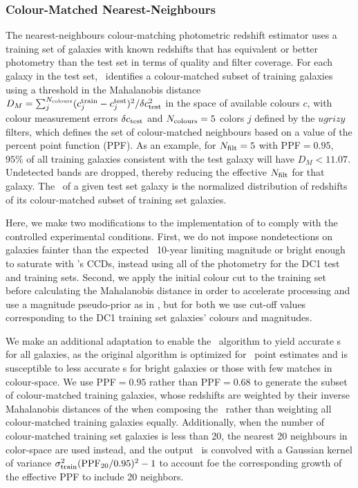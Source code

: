 \subsubsection{Colour-Matched Nearest-Neighbours}
\label{sec:cmnn}

The nearest-neighbours colour-matching photometric redshift estimator \citep[\cmnn,][]{Graham:17} uses a training set of galaxies with known redshifts that has equivalent or better photometry than the test set in terms of quality and filter coverage.
For each galaxy in the test set, \cmnn\ identifies a colour-matched subset of training galaxies using a threshold in the Mahalanobis distance $D_M = \sum_{j}^{N_{\rm colours}} (c^{\rm train}_{j} - c^{\rm test}_{j})^{2} / \delta c_{\rm test}^2$ in the space of available colours $c$, with colour measurement errors $\delta c_{\rm test}$ and $N_{\rm colours} = 5$ colors $j$ defined by the $ugrizy$ filters, which defines the set of colour-matched neighbours based on a value of the percent point function (PPF).
As an example, for $N_{\rm{filt}}=5$ with PPF$=0.95$, $95\%$ of all training galaxies consistent with the test galaxy will have $D_M < 11.07$.
Undetected bands are dropped, thereby reducing the effective $N_{\rm{filt}}$ for that galaxy.
The \pzpdf\ of a given test set galaxy is the normalized distribution of redshifts of its colour-matched subset of training set galaxies.

Here, we make two modifications to the implementation of \citet{Graham:17} to comply with the controlled experimental conditions.
First, we do not impose nondetections on galaxies fainter than the expected \lsst\ 10-year limiting magnitude or bright enough to saturate with \lsst's CCDs, instead using all of the photometry for the DC1 test and training sets.
Second, we apply the initial colour cut to the training set before calculating the Mahalanobis distance in order to accelerate processing and use a magnitude pseudo-prior as in \citet{Graham:17}, but for both we use cut-off values corresponding to the DC1 training set galaxies' colours and magnitudes.

We make an additional adaptation to enable the \cmnn\ algorithm to yield accurate \pzpdf s for all galaxies, as the original \citet{Graham:17} algorithm is optimized for \pz\ point estimates and is susceptible to less accurate \pzpdf s for bright galaxies or those with few matches in colour-space.
We use PPF$=0.95$ rather than PPF$=0.68$ to generate the subset of colour-matched training galaxies, whose redshifts are weighted by their inverse Mahalanobis distances of the when composing the \pzpdf\ rather than weighting all colour-matched training galaxies equally.
Additionally, when the number of colour-matched training set galaxies is less than 20, the nearest 20 neighbours in color-space are used instead, and the output \pzpdf\ is convolved with a Gaussian kernel of variance $\sigma_{\rm train}^{2}({\rm PPF}_{20}/0.95)^2 -1$ to account foe the corresponding growth of the effective PPF to include 20 neighbors.

